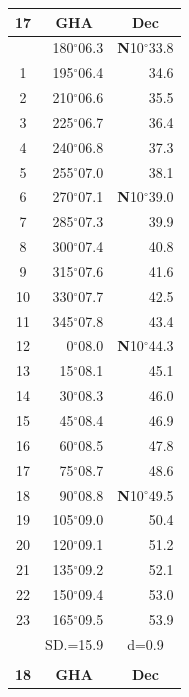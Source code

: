 \documentclass[10pt, a4paper]{report}
\begin{document}
\begin{scriptsize}
\noindent
\begin{tabular*}{0.2\textwidth}[t]{@{\extracolsep{\fill}}|c|rr|}
\hline
\multicolumn{1}{|c|}{\rule{0pt}{2.6ex}\textbf{17}} & \multicolumn{1}{c}{\textbf{GHA}} & \multicolumn{1}{c|}{\textbf{Dec}}\\
\hline\rule{0pt}{2.6ex}\noindent
0 & 180$^\circ$06.3 & \textbf{N}10$^\circ$33.8\\
1 & 195$^\circ$06.4 & 34.6\\
2 & 210$^\circ$06.6 & 35.5\\
3 & 225$^\circ$06.7 & \raisebox{0.24ex}{\boldmath$\cdot$~\boldmath$\cdot$~~}36.4\\
4 & 240$^\circ$06.8 & 37.3\\
5 & 255$^\circ$07.0 & 38.1\\[2Pt]
6 & 270$^\circ$07.1 & \textbf{N}10$^\circ$39.0\\
7 & 285$^\circ$07.3 & 39.9\\
8 & 300$^\circ$07.4 & 40.8\\
9 & 315$^\circ$07.6 & \raisebox{0.24ex}{\boldmath$\cdot$~\boldmath$\cdot$~~}41.6\\
10 & 330$^\circ$07.7 & 42.5\\
11 & 345$^\circ$07.8 & 43.4\\[2Pt]
12 & 0$^\circ$08.0 & \textbf{N}10$^\circ$44.3\\
13 & 15$^\circ$08.1 & 45.1\\
14 & 30$^\circ$08.3 & 46.0\\
15 & 45$^\circ$08.4 & \raisebox{0.24ex}{\boldmath$\cdot$~\boldmath$\cdot$~~}46.9\\
16 & 60$^\circ$08.5 & 47.8\\
17 & 75$^\circ$08.7 & 48.6\\[2Pt]
18 & 90$^\circ$08.8 & \textbf{N}10$^\circ$49.5\\
19 & 105$^\circ$09.0 & 50.4\\
20 & 120$^\circ$09.1 & 51.2\\
21 & 135$^\circ$09.2 & \raisebox{0.24ex}{\boldmath$\cdot$~\boldmath$\cdot$~~}52.1\\
22 & 150$^\circ$09.4 & 53.0\\
23 & 165$^\circ$09.5 & 53.9\\
\hline
\rule{0pt}{2.4ex} & \multicolumn{1}{c}{SD.=15.9} & \multicolumn{1}{c|}{d=0.9}\\
\hline
\multicolumn{1}{c}{}\\[-0.5ex]\hline
\multicolumn{1}{|c|}{\rule{0pt}{2.6ex}\textbf{18}} & \multicolumn{1}{c}{\textbf{GHA}} & \multicolumn{1}{c|}{\textbf{Dec}}\\

\end{tabular*}
\end{scriptsize}
\end{document}
